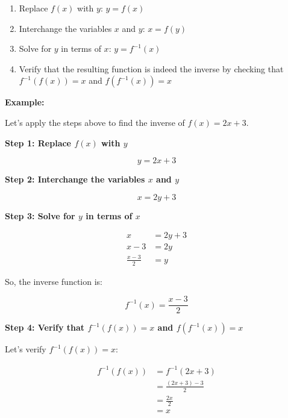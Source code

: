 \begin{enumerate}
	
	\item Replace \(f (x)\) with \(y\): \(y = f (x)\)
	
	\item Interchange the variables \(x\) and \(y\): \(x = f (y)\)
	
	\item Solve for \(y\) in terms of \(x\): \(y = f^{-1} (x)\)
	
	\item Verify that the resulting function is indeed the inverse by checking that \(f^{-1}(f(x)) = x\) 
		  and \(f (f^{-1} (x)) = x\)

		\end{enumerate}

\textbf{Example:}
\vspace{\baselineskip}

Let's apply the steps above to find the inverse of \(f (x) = 2x + 3\).
\vspace{\baselineskip}

\textbf{Step 1: Replace \(f(x)\) with \(y\)}

\[
	y = 2x + 3
\]

\textbf{Step 2: Interchange the variables \(x\) and \(y\)}

\[
	x = 2y + 3
\]

\textbf{Step 3: Solve for \(y\) in terms of \(x\)}

\begin{align*}
	x               & = 2y + 3 \\
	x - 3           & = 2y     \\
	\frac{x - 3}{2} & = y
\end{align*}

So, the inverse function is:

\[
	f^{-1}(x) = \frac{x - 3}{2}
\]

\textbf{Step 4: Verify that \(f^{-1} (f (x)) = x\) and \(f(f^{-1} (x)) = x\)}

Let's verify \(f^{-1} (f (x)) = x\):

\begin{align*}
	f^{-1}(f(x)) & = f^{-1}(2x + 3)         \\
	             & = \frac{(2x + 3) - 3}{2} \\
	             & = \frac{2x}{2}           \\
	             & = x
\end{align*}


